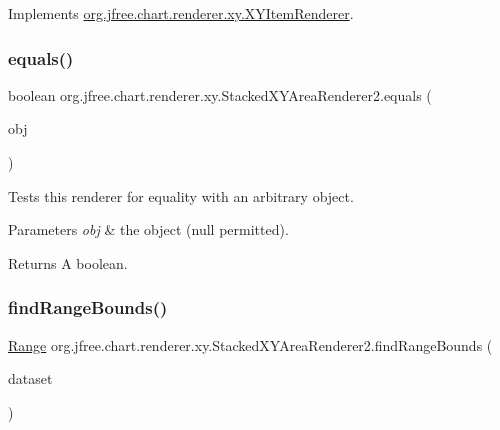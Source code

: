 Implements \mbox{\hyperlink{interfaceorg_1_1jfree_1_1chart_1_1renderer_1_1xy_1_1_x_y_item_renderer_ad867040a3ea09f5127596aacdd94586a}{org.\+jfree.\+chart.\+renderer.\+xy.\+X\+Y\+Item\+Renderer}}.

\mbox{\label{classorg_1_1jfree_1_1chart_1_1renderer_1_1xy_1_1_stacked_x_y_area_renderer2_a53f763e31ca8d3ace13f01ee9f977bcb}} 
\subsubsection{\texorpdfstring{equals()}{equals()}}
{\footnotesize\ttfamily boolean org.\+jfree.\+chart.\+renderer.\+xy.\+Stacked\+X\+Y\+Area\+Renderer2.\+equals (\begin{DoxyParamCaption}\item[{Object}]{obj }\end{DoxyParamCaption})}

Tests this renderer for equality with an arbitrary object.


\begin{DoxyParams}{Parameters}
{\em obj} & the object ({\ttfamily null} permitted).\\
\hline
\end{DoxyParams}
\begin{DoxyReturn}{Returns}
A boolean. 
\end{DoxyReturn}
\mbox{\label{classorg_1_1jfree_1_1chart_1_1renderer_1_1xy_1_1_stacked_x_y_area_renderer2_aedbc0b86088deae5df4c43dca22d8bc3}} 
\subsubsection{\texorpdfstring{find\+Range\+Bounds()}{findRangeBounds()}}
{\footnotesize\ttfamily \mbox{\hyperlink{classorg_1_1jfree_1_1data_1_1_range}{Range}} org.\+jfree.\+chart.\+renderer.\+xy.\+Stacked\+X\+Y\+Area\+Renderer2.\+find\+Range\+Bounds (\begin{DoxyParamCaption}\item[{\mbox{\hyperlink{interfaceorg_1_1jfree_1_1data_1_1xy_1_1_x_y_dataset}{X\+Y\+Dataset}}}]{dataset }\end{DoxyParamCaption})}

